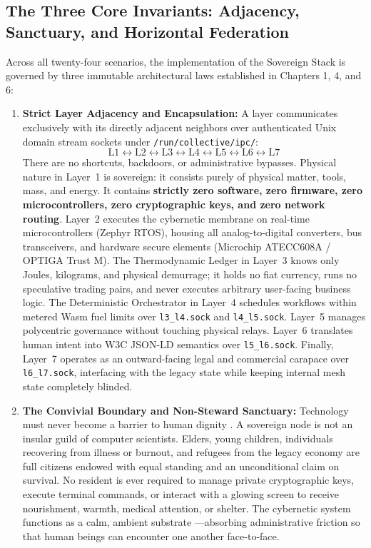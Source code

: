 \subsection{The Three Core Invariants: Adjacency, Sanctuary, and Horizontal Federation}
Across all twenty-four scenarios, the implementation of the Sovereign Stack is governed by three immutable architectural laws established in Chapters 1, 4, and 6:

\begin{enumerate}
    \item \textbf{Strict Layer Adjacency and Encapsulation:} A layer communicates exclusively with its directly adjacent neighbors over authenticated Unix domain stream sockets under \texttt{/run/collective/ipc/}:
    \[
    \mathrm{L1} \longleftrightarrow \mathrm{L2} \longleftrightarrow \mathrm{L3} \longleftrightarrow \mathrm{L4} \longleftrightarrow \mathrm{L5} \longleftrightarrow \mathrm{L6} \longleftrightarrow \mathrm{L7}
    \]
    There are no shortcuts, backdoors, or administrative bypasses. Physical nature in Layer~1 is sovereign: it consists purely of physical matter, tools, mass, and energy. It contains \textbf{strictly zero software, zero firmware, zero microcontrollers, zero cryptographic keys, and zero network routing}. Layer~2 executes the cybernetic membrane on real-time microcontrollers (Zephyr RTOS), housing all analog-to-digital converters, bus transceivers, and hardware secure elements (Microchip ATECC608A / OPTIGA Trust M). The Thermodynamic Ledger in Layer~3 knows only Joules, kilograms, and physical demurrage; it holds no fiat currency, runs no speculative trading pairs, and never executes arbitrary user-facing business logic. The Deterministic Orchestrator in Layer~4 schedules workflows within metered Wasm fuel limits over \texttt{l3\_l4.sock} and \texttt{l4\_l5.sock}. Layer~5 manages polycentric governance without touching physical relays. Layer~6 translates human intent into W3C JSON-LD semantics over \texttt{l5\_l6.sock}. Finally, Layer~7 operates as an outward-facing legal and commercial carapace over \texttt{l6\_l7.sock}, interfacing with the legacy state while keeping internal mesh state completely blinded.

    \item \textbf{The Convivial Boundary and Non-Steward Sanctuary:} Technology must never become a barrier to human dignity \parencite{illich1973}. A sovereign node is not an insular guild of computer scientists. Elders, young children, individuals recovering from illness or burnout, and refugees from the legacy economy are full citizens endowed with equal standing and an unconditional claim on survival. No resident is ever required to manage private cryptographic keys, execute terminal commands, or interact with a glowing screen to receive nourishment, warmth, medical attention, or shelter. The cybernetic system functions as a calm, ambient substrate \parencite{weiser1996calm}---absorbing administrative friction so that human beings can encounter one another face-to-face.


\end{enumerate}
